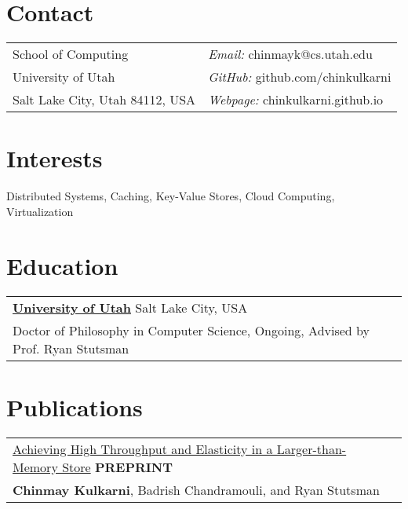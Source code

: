 \documentclass[margin,line]{res}
\begin{document}
\name{Chinmay Kulkarni\newline %
      {\small PhD Student, University of Utah}}
\begin{resume}
\section{\sc Contact}
 \begin{tabular}{@{}p{3.25in}p{4in}}
 School of Computing                             & {\it Email:  }  chinmayk@cs.utah.edu \\
 University of Utah                              & {\it GitHub:}   github.com/chinkulkarni \\
 Salt Lake City, Utah 84112, USA                 & {\it Webpage:}  chinkulkarni.github.io \\
 \end{tabular}

\section{\sc Interests}
Distributed Systems, Caching, Key-Value Stores, Cloud Computing, Virtualization

\section{\sc Education}
 \begin{tabular}{@{}p{5.5in}p{4in}}
  {\bf \href{http://www.cs.utah.edu/}{University of Utah}} \dotfill Salt Lake City,
  USA \\
 {\small Doctor of Philosophy in Computer Science, Ongoing, Advised by Prof. Ryan Stutsman}
 \end{tabular}

\section{\sc Publications}
 \vspace{-2.5pt}
 \begin{tabular}{@{}p{5.5in}p{4in}}
 \href{https://arxiv.org/abs/2006.03206}{Achieving High Throughput and
 Elasticity in a Larger-than-Memory Store} \hfill
 {\small\bf PREPRINT}\\
 {\small {\bf Chinmay Kulkarni}, Badrish Chandramouli, and Ryan Stutsman}\\
 \end{tabular}


\end{resume}
\end{document}
